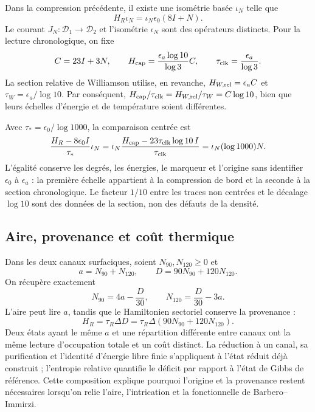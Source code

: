 Dans la compression précédente, il existe une isométrie basée $\iota_N$ telle que
\[
 H_R\iota_N=\iota_N\epsilon_0(8I+N).
\]
Le courant $J_N:\mathcal D_1\to\mathcal D_2$ et l’isométrie
$\iota_N$ sont des opérateurs distincts. Pour la lecture chronologique, on fixe
\begin{equation}
 C=23I+3N,\qquad
 H_{\rm cap}=\frac{\epsilon_a\log10}{\log3}C,
 \qquad \tau_{\rm clk}=\frac{\epsilon_a}{\log3}.
 \label{v:eq:lector-capacidad-escalas}
\end{equation}
La section relative de Williamson utilise, en revanche,
$H_{W,{\rm rel}}=\epsilon_a C$ et
$\tau_W=\epsilon_a/\log10$. Par conséquent,
$H_{\rm cap}/\tau_{\rm clk}=H_{W,{\rm rel}}/\tau_W=C\log10$,
bien que leurs échelles d’énergie et de température soient différentes.

Avec $\tau_*=\epsilon_0/\log1000$, la comparaison centrée est
\begin{equation}
 \frac{H_R-8\epsilon_0I}{\tau_*}\iota_N
 =\iota_N\frac{H_{\rm cap}-23\tau_{\rm clk}\log10\,I}
                    {\tau_{\rm clk}}
 =\iota_N(\log1000)N.
 \label{v:eq:transporte-termico-centrado}
\end{equation}
L’égalité conserve les degrés, les énergies, le marqueur et l’origine sans identifier
$\epsilon_0$ à $\epsilon_a$ : la première échelle appartient à la compression
de bord et la seconde à la section chronologique. Le facteur $1/10$ entre
les traces non centrées et le décalage $\log10$ sont des données de la section,
non des défauts de la densité.

\subsection{Aire, provenance et coût thermique}

Dans les deux canaux surfaciques, soient $N_{90},N_{120}\ge0$ et
\begin{equation}
 a=N_{90}+N_{120},\qquad
 D=90N_{90}+120N_{120}.
 \label{v:eq:ocupacion-procedencia-90-120}
\end{equation}
On récupère exactement
\begin{equation}
 N_{90}=4a-\frac D{30},\qquad
 N_{120}=\frac D{30}-3a.
 \label{v:eq:inversion-procedencia-90-120}
\end{equation}
L’aire peut lire $a$, tandis que le Hamiltonien sectoriel conserve la
provenance :
\begin{equation}
 H_R=\tau_R\Delta D
 =\tau_R\Delta(90N_{90}+120N_{120}).
 \label{v:eq:hamiltoniano-area-procedencia}
\end{equation}
Deux états ayant le même $a$ et une répartition différente entre canaux ont la
même lecture d’occupation totale et un coût distinct. La réduction à un canal,
sa purification et l’identité d’énergie libre finie s’appliquent à l’état
réduit déjà construit ; l’entropie relative quantifie le déficit par rapport
à l’état de Gibbs de référence. Cette composition explique pourquoi
l’origine et la provenance restent nécessaires lorsqu’on relie l’aire,
l’intrication et la fonctionnelle de Barbero--Immirzi.


